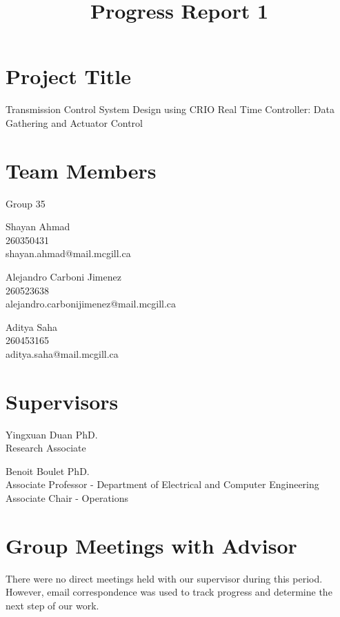 \documentclass[12pt]{article}
\begin{document}
\title{Progress Report 1}
\date{}
\maketitle
\section*{Project Title} 
Transmission Control System Design using CRIO Real Time Controller:
Data Gathering and Actuator Control
\section*{Team Members}
Group 35 \newline

\hangindent=17.62482pt
Shayan Ahmad \\
260350431 \\
shayan.ahmad@mail.mcgill.ca \newline

\hangindent=17.62482pt
Alejandro Carboni Jimenez \\
260523638 \\
alejandro.carbonijimenez@mail.mcgill.ca \newline

\hangindent=17.62482pt
Aditya Saha \\
260453165 \\
aditya.saha@mail.mcgill.ca

\section*{Supervisors}
\hangindent=17.62482pt
Yingxuan Duan PhD.\\ 
Research Associate\newline 

\hangindent=17.62482pt
Benoit Boulet PhD.\\
Associate Professor - Department of Electrical and Computer Engineering\\
Associate Chair - Operations

\newpage
\section*{Group Meetings with Advisor}
There were no direct meetings held with our supervisor during this period. 
However, email correspondence was used to track progress and determine the
next step of our work.
\end{document}
